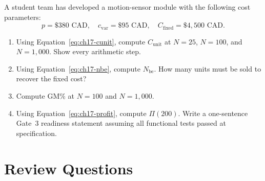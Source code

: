 A student team has developed a motion-sensor module with the following
cost parameters:
\[
  p = \$380\text{ CAD},\quad
  c_{\text{var}} = \$95\text{ CAD},\quad
  C_{\text{fixed}} = \$4{,}500\text{ CAD.}
\]

\begin{enumerate}
  \item[(a)] Using Equation~\ref{eq:ch17-cunit}, compute $C_{\text{unit}}$
        at $N = 25$, $N = 100$, and $N = 1{,}000$.
        Show every arithmetic step.

  \item[(b)] Using Equation~\ref{eq:ch17-nbe}, compute $N_{\text{be}}$.
        How many units must be sold to recover the fixed cost?

  \item[(c)] Compute GM\% at $N = 100$ and $N = 1{,}000$.

  \item[(d)] Using Equation~\ref{eq:ch17-profit}, compute $\Pi(200)$.
        Write a one-sentence Gate~3 readiness statement assuming all
        functional tests passed at specification.
\end{enumerate}

\section*{Review Questions}
\label{sec:ch17-review}


